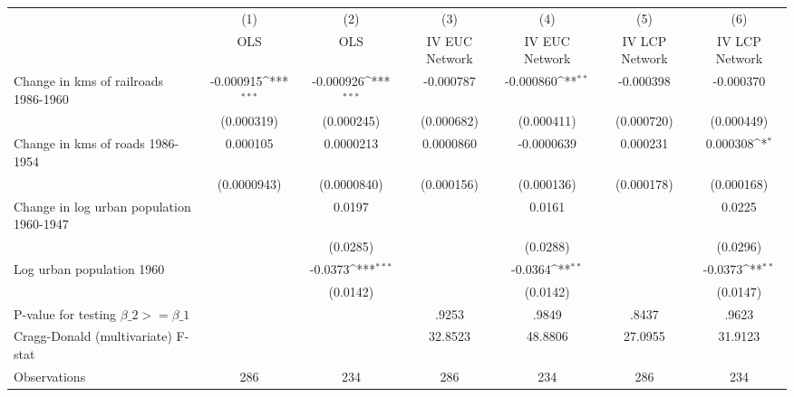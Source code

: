 {
\def\sym#1{\ifmmode^{#1}\else\(^{#1}\)\fi}
\begin{tabular}{l*{6}{c}}
\hline\hline
                &\multicolumn{1}{c}{(1)}&\multicolumn{1}{c}{(2)}&\multicolumn{1}{c}{(3)}&\multicolumn{1}{c}{(4)}&\multicolumn{1}{c}{(5)}&\multicolumn{1}{c}{(6)}\\
                &\multicolumn{1}{c}{OLS}&\multicolumn{1}{c}{OLS}&\multicolumn{1}{c}{IV EUC Network}&\multicolumn{1}{c}{IV EUC Network}&\multicolumn{1}{c}{IV LCP Network}&\multicolumn{1}{c}{IV LCP Network}\\
\hline
Change in kms of railroads 1986-1960&-0.000915\sym{***}&-0.000926\sym{***}&-0.000787         &-0.000860\sym{**} &-0.000398         &-0.000370         \\
                &(0.000319)         &(0.000245)         &(0.000682)         &(0.000411)         &(0.000720)         &(0.000449)         \\
[1em]
Change in kms of roads 1986-1954& 0.000105         &0.0000213         &0.0000860         &-0.0000639         & 0.000231         & 0.000308\sym{*}  \\
                &(0.0000943)         &(0.0000840)         &(0.000156)         &(0.000136)         &(0.000178)         &(0.000168)         \\
[1em]
Change in log urban population 1960-1947&                  &   0.0197         &                  &   0.0161         &                  &   0.0225         \\
                &                  & (0.0285)         &                  & (0.0288)         &                  & (0.0296)         \\
[1em]
Log urban population 1960&                  &  -0.0373\sym{***}&                  &  -0.0364\sym{**} &                  &  -0.0373\sym{**} \\
                &                  & (0.0142)         &                  & (0.0142)         &                  & (0.0147)         \\
\hline
P-value for testing $\beta\_{2} >= \beta\_{1}$&                  &                  &    .9253         &    .9849         &    .8437         &    .9623         \\
Cragg-Donald (multivariate) F-stat&                  &                  &  32.8523         &  48.8806         &  27.0955         &  31.9123         \\
Observations    &      286         &      234         &      286         &      234         &      286         &      234         \\
\hline\hline
\end{tabular}
}
